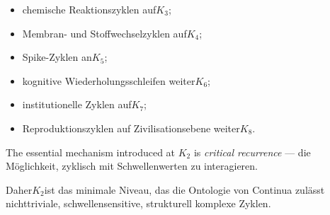 \begin{itemize}
  \item chemische Reaktionszyklen auf$K_3$;
  \item Membran- und Stoffwechselzyklen auf$K_4$;
  \item Spike-Zyklen an$K_5$;
  \item kognitive Wiederholungsschleifen weiter$K_6$;
  \item institutionelle Zyklen auf$K_7$;
  \item Reproduktionszyklen auf Zivilisationsebene weiter$K_8$.
\end{itemize}

The essential mechanism introduced at $K_2$ is \emph{critical recurrence}
— die Möglichkeit, zyklisch mit Schwellenwerten zu interagieren.

Daher$K_2$ist das minimale Niveau, das die Ontologie von Continua zulässt
nichttriviale, schwellensensitive, strukturell komplexe Zyklen.

